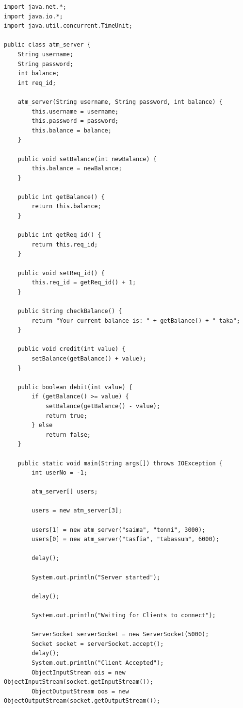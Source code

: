 \documentclass[11pt]{article}
\begin{document}
\begin{verbatim}
import java.net.*;
import java.io.*;
import java.util.concurrent.TimeUnit;

public class atm_server {
    String username;
    String password;
    int balance;
    int req_id;

    atm_server(String username, String password, int balance) {
        this.username = username;
        this.password = password;
        this.balance = balance;
    }

    public void setBalance(int newBalance) {
        this.balance = newBalance;
    }

    public int getBalance() {
        return this.balance;
    }

    public int getReq_id() {
        return this.req_id;
    }

    public void setReq_id() {
        this.req_id = getReq_id() + 1;
    }

    public String checkBalance() {
        return "Your current balance is: " + getBalance() + " taka";
    }

    public void credit(int value) {
        setBalance(getBalance() + value);
    }

    public boolean debit(int value) {
        if (getBalance() >= value) {
            setBalance(getBalance() - value);
            return true;
        } else
            return false;
    }

    public static void main(String args[]) throws IOException {
        int userNo = -1;

        atm_server[] users;

        users = new atm_server[3];

        users[1] = new atm_server("saima", "tonni", 3000);
        users[0] = new atm_server("tasfia", "tabassum", 6000);

        delay();

        System.out.println("Server started");

        delay();

        System.out.println("Waiting for Clients to connect");

        ServerSocket serverSocket = new ServerSocket(5000);
        Socket socket = serverSocket.accept();
        delay();
        System.out.println("Client Accepted");
        ObjectInputStream ois = new ObjectInputStream(socket.getInputStream());
        ObjectOutputStream oos = new ObjectOutputStream(socket.getOutputStream());


\end{verbatim}
\end{document}
